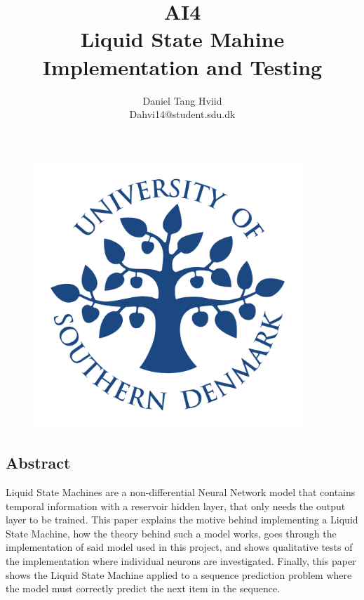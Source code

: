 \documentclass[english,a5paper,oneside, onecolumn,article,9pt]{memoir}
\title{\Huge{AI4} \Large{ \\ Liquid State Mahine \\ Implementation and Testing}}
\author{Daniel Tang Hviid \\ Dahvi14@student.sdu.dk}
\begin{document}
\maketitle

\begin{figure}[h]
    \centering
        \includegraphics[width=0.9\textwidth]{Images/Logo.png}
\end{figure}

\newpage

\begin{centering}
\section*{Abstract}
\end{centering}

Liquid State Machines are a non-differential Neural Network model that contains temporal information with a reservoir hidden layer, that only needs the output layer to be trained.
This paper explains the motive behind implementing a Liquid State Machine, how the theory behind such a model works, goes through the implementation of said model used in this project, and shows qualitative tests of the implementation where individual neurons are investigated.
Finally, this paper shows the Liquid State Machine applied to a sequence prediction problem where the model must correctly predict the next item in the sequence.
\end{document}
